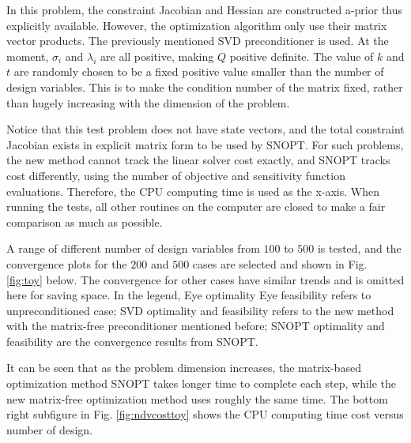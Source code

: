 \documentclass{article}
\theoremstyle{definition}
\begin{document}
In this problem, the constraint Jacobian and Hessian are constructed a-prior thus explicitly available. However, the optimization algorithm only use their matrix vector products. The previously mentioned SVD preconditioner is used. At the moment, $\sigma_i$ and $\lambda_i$ are all positive, making $Q$ positive definite. The value of $k$ and $t$ are randomly chosen to be a fixed positive value smaller than the number of design variables. This is to make the condition number of the matrix fixed, rather than hugely increasing with the dimension of the problem. 

Notice that this test problem does not have state vectors, and the total constraint Jacobian exists in explicit matrix form to be used by SNOPT. For such problems, the new method cannot track the linear solver cost exactly, and SNOPT tracks cost differently, using the number of objective and sensitivity function evaluations. Therefore, the CPU computing time is used as the x-axis. When running the tests, all other routines on the computer are closed to make a fair comparison as much as possible. 

A range of different number of design variables from $100$ to $500$ is tested, and the 
convergence plots for the $200$ and $500$ cases are selected and shown in Fig. \ref{fig:toy} below. The convergence for other cases have similar trends and is omitted here for saving space. In the legend, Eye optimality Eye feasibility refers to unpreconditioned case; SVD optimality and feasibility refers to the new method with the matrix-free preconditioner mentioned before; SNOPT optimality and feasibility are the convergence results from SNOPT. 

It can be seen that as the problem dimension increases, the matrix-based optimization method SNOPT takes longer time to complete each step, while the new matrix-free optimization method uses roughly the same time. The bottom right subfigure in Fig. \ref{fig:ndvcosttoy} shows the CPU computing time cost versus number of design. 
\end{document}
